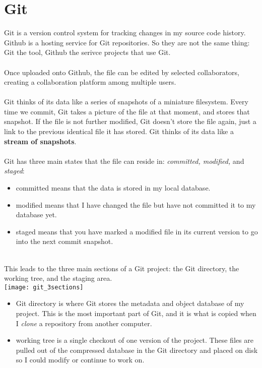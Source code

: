 \documentclass{article}
\begin{document}
{{{\section{Git}
Git is a version control system for tracking changes in my source code history. Github is a hosting service for Git repositories. So they are not the same thing: Git the tool, Github the serivce projects that use Git. \\
\\
Once uploaded onto Github, the file can be edited by selected collaborators, creating a collaboration platform among multiple users. \\
\\
Git thinks of its data like a series of snapshots of a miniature filesystem. Every time we commit, Git takes a picture of the file at that moment, and stores that snapshot. If the file is not further modified, Git doesn't store the file again, just a link to the previous identical file it has stored. Git thinks of its data like a \textbf{stream of snapshots}.\\
\\
Git has three main states that the file can reside in: \textit{committed, modified,} and \textit{staged}:
\begin{itemize}
  \item committed means that the data is stored in my local database.
  \item modified means that I have changed the file but have not committed it to my database yet.
  \item staged means that you have marked a modified file in its current version to go into the next commit snapshot. 
\end{itemize}
\\
This leads to the three main sections of a Git project: the Git directory, the working tree, and the staging area.\\
\texttt{[image: git\_3sections]}\\
\begin{itemize}
  \item Git directory is where Git stores the metadata and object database of my project. This is the most important part of Git, and it is what is copied when I \textit{clone} a repository from another computer.
  \item working tree is a single checkout of one version of the project. These files are pulled out of the compressed database in the Git directory and placed on disk so I could modify or continue to work on. 

\end{itemize}}}}
\end{document}
